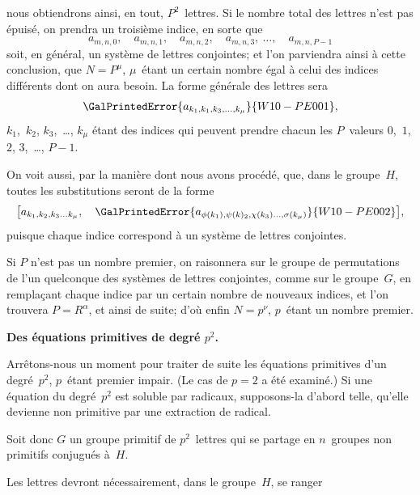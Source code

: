 nous obtiendrons ainsi, en tout, $P^{2}$~lettres. Si le nombre total
des lettres n'est pas épuisé, on prendra un troisième indice, en
sorte que
\[
a_{m,n,0}, \quad a_{m,n,1}, \quad a_{m,n,2}, \quad a_{m,n,3},\ \dots, \quad a_{m,n,P-1}
\]
soit, en général, un système de lettres conjointes; et l'on parviendra
ainsi à cette conclusion, que $N = P^{\mu}$, $\mu$~étant un certain
nombre égal à celui des indices différents dont on aura besoin. La
forme générale des lettres sera
\[
\GalPrintedError{a_{k_{1}, k_{1}, k_{3}, \dots, k_{\mu}}}{W10-PE001},
\]
$k_{1}$,~$k_{2}$, $k_{3}$,~\dots, $k_{\mu}$ étant des indices qui peuvent prendre chacun
les $P$~valeurs $0$,~$1$, $2$, $3$,~\dots, $P - 1$.

On voit aussi, par la manière dont nous avons procédé, que,
dans le groupe~$H$, toutes les substitutions seront de la forme
\[
\bigl[a_{k_{1}, k_{2}, k_{3} \dots k_{\mu}}, \quad
      \GalPrintedError{a_{\phi(k_{1}), \psi(k)_{2}, \chi(k_{3}) \dots, \sigma(k_{\mu})}}{W10-PE002}
\bigr],
\]
puisque chaque indice correspond à un système de lettres conjointes.

Si $P$ n'est pas un nombre premier, on raisonnera sur le groupe
de permutations de l'un quelconque des systèmes de lettres conjointes,
comme sur le groupe~$G$, en remplaçant chaque indice
par un certain nombre de nouveaux indices, et l'on trouvera
$P = R^{\alpha}$, et ainsi de suite; d'où enfin $N = p^{\nu}$, $p$~étant un nombre
premier.


\begin{center}\bfseries Des équations primitives de degré $p^{2}$.\end{center}

Arrêtons-nous un moment pour traiter de suite les équations
primitives d'un degré~$p^{2}$, $p$~étant premier impair. (Le cas de
$p = 2$ a été examiné.) Si une équation du degré~$p^{2}$ est soluble
par radicaux, supposons-la d'abord telle, qu'elle devienne non
primitive par une extraction de radical.

Soit donc $G$ un groupe primitif de $p^{2}$~lettres qui se partage
en $n$~groupes non primitifs conjugués à~$H$.

Les lettres devront nécessairement, dans le groupe~$H$, se ranger
